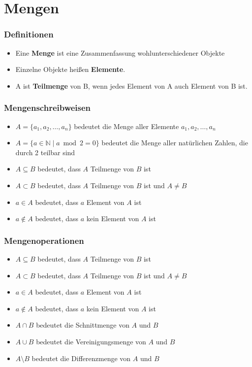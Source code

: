 \section{Mengen}
\begin{frame}
    \frametitle{Definitionen}
    \begin{itemize}
        \item Eine \textbf{Menge} ist eine Zusammenfassung wohlunterschiedener Objekte
        \item Einzelne Objekte heißen \textbf{Elemente}.
        \item A ist \textbf{Teilmenge} von B, wenn jedes Element von A auch Element von B ist.
    \end{itemize}
\end{frame}

\begin{frame}
    \frametitle{Mengenschreibweisen}
    \begin{itemize}
        \item $A = \{a_1, a_2, \dots, a_n\} $ bedeutet die Menge aller Elemente $a_1, a_2, \dots, a_n$
        \item $A = \{a \in \mathbb{N} \mid a \bmod 2 = 0\}$ bedeutet die Menge aller natürlichen Zahlen, die durch 2 teilbar sind
        \item $ A \subseteq B $ bedeutet, dass $ A $ Teilmenge von $ B $ ist
        \item $ A \subset B $ bedeutet, dass $ A $ Teilmenge von $ B $ ist und $ A \neq B $
        \item $a \in A$ bedeutet, dass $a$ Element von $A$ ist
        \item $a \notin A$ bedeutet, dass $a$ kein Element von $A$ ist
    \end{itemize}
\end{frame}

\begin{frame}
    \frametitle{Mengenoperationen}
    \begin{itemize}
        \item $ A \subseteq B $ bedeutet, dass $ A $ Teilmenge von $ B $ ist
        \item $ A \subset B $ bedeutet, dass $ A $ Teilmenge von $ B $ ist und $ A \neq B $
        \item $a \in A$ bedeutet, dass $a$ Element von $A$ ist
        \item $a \notin A$ bedeutet, dass $a$ kein Element von $A$ ist
        \item $A \cap B$ bedeutet die Schnittmenge von $A$ und $B$
        \item $A \cup B$ bedeutet die Vereinigungsmenge von $A$ und $B$
        \item $A \setminus B$ bedeutet die Differenzmenge von $A$ und $B$
    \end{itemize}
\end{frame}

